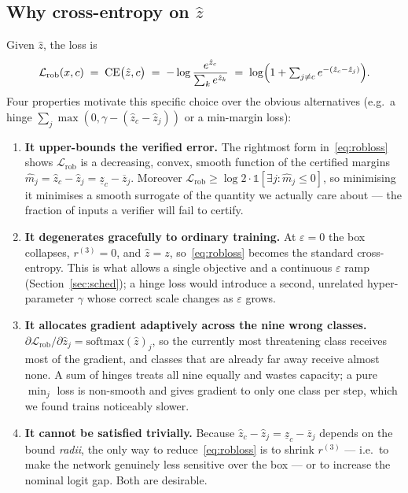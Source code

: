 \documentclass[11pt,a4paper]{article}
\newcommand{\eps}{\varepsilon}
\newcommand{\lb}[1]{\underline{#1}}
\newcommand{\ub}[1]{\overline{#1}}
\begin{document}
\subsection{Why cross-entropy on $\hat z$}
Given $\hat z$, the loss is
\begin{equation}
\mathcal{L}_{\mathrm{rob}}(x,c) \;=\; \mathrm{CE}\bigl(\hat z, c\bigr)
\;=\; -\log\frac{e^{\hat z_c}}{\sum_k e^{\hat z_k}}
\;=\; \log\Bigl(1+\textstyle\sum_{j\neq c} e^{-(\hat z_c-\hat z_j)}\Bigr).
\label{eq:robloss}
\end{equation}
Four properties motivate this specific choice over the obvious alternatives
(e.g.\ a hinge $\sum_j\max(0,\gamma-(\hat z_c-\hat z_j))$ or a min-margin loss):

\begin{enumerate}[label=(\roman*)]
\item \textbf{It upper-bounds the verified error.} The rightmost form
in~\eqref{eq:robloss} shows $\mathcal{L}_{\mathrm{rob}}$ is a decreasing,
convex, smooth function of the certified margins
$\hat m_j = \hat z_c-\hat z_j = \lb{z}_c-\ub{z}_j$. Moreover
$\mathcal{L}_{\mathrm{rob}}\ge \log 2\cdot\mathbb{1}[\exists j:\hat m_j\le 0]$,
so minimising it minimises a smooth surrogate of the quantity we actually care
about --- the fraction of inputs a verifier will fail to certify.
\item \textbf{It degenerates gracefully to ordinary training.} At $\eps=0$ the
box collapses, $r^{(3)}=0$, and $\hat z = z$, so~\eqref{eq:robloss} becomes the
standard cross-entropy. This is what allows a single objective and a continuous
$\eps$ ramp (Section~\ref{sec:sched}); a hinge loss would introduce a second,
unrelated hyper-parameter $\gamma$ whose correct scale changes as $\eps$ grows.
\item \textbf{It allocates gradient adaptively across the nine wrong classes.}
$\partial\mathcal{L}_{\mathrm{rob}}/\partial \hat z_j = \mathrm{softmax}(\hat z)_j$,
so the currently most threatening class receives most of the gradient, and
classes that are already far away receive almost none. A sum of hinges treats
all nine equally and wastes capacity; a pure $\min_j$ loss is non-smooth and
gives gradient to only one class per step, which we found trains noticeably
slower.
\item \textbf{It cannot be satisfied trivially.} Because
$\hat z_c-\hat z_j=\lb{z}_c-\ub{z}_j$ depends on the bound \emph{radii}, the only
way to reduce~\eqref{eq:robloss} is to shrink $r^{(3)}$ --- i.e.\ to make the
network genuinely less sensitive over the box --- or to increase the nominal
logit gap. Both are desirable.
\end{enumerate}
\end{document}
